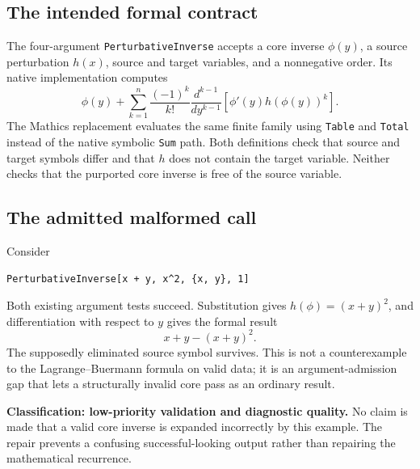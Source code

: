\documentclass[11pt,letterpaper]{article}
\newcommand{\code}[1]{\nolinkurl{#1}}
\begin{document}
\subsection{The intended formal contract}
The four-argument \code{PerturbativeInverse} accepts a core inverse \(\phi(y)\), a source perturbation \(h(x)\), source and target variables, and a nonnegative order. Its native implementation computes
\begin{equation}
 \phi(y)+\sum_{k=1}^{n}\frac{(-1)^k}{k!}
 \frac{d^{k-1}}{dy^{k-1}}
 \left[\phi'(y)h(\phi(y))^k\right].
 \label{eq:perturbative}
\end{equation}
The Mathics replacement evaluates the same finite family using \code{Table} and \code{Total} instead of the native symbolic \code{Sum} path. Both definitions check that source and target symbols differ and that \(h\) does not contain the target variable. Neither checks that the purported core inverse is free of the source variable.\cite{core,mathicscalculus}

\subsection{The admitted malformed call}
Consider
\par\noindent\begin{minipage}{\linewidth}
\begin{lstlisting}
PerturbativeInverse[x + y, x^2, {x, y}, 1]
\end{lstlisting}
\end{minipage}\par
Both existing argument tests succeed. Substitution gives \(h(\phi)=(x+y)^2\), and differentiation with respect to \(y\) gives the formal result
\[
 x+y-(x+y)^2.
\]
The supposedly eliminated source symbol survives. This is not a counterexample to the Lagrange--Buermann formula on valid data; it is an argument-admission gap that lets a structurally invalid core pass as an ordinary result.

\textbf{Classification: low-priority validation and diagnostic quality.} No claim is made that a valid core inverse is expanded incorrectly by this example. The repair prevents a confusing successful-looking output rather than repairing the mathematical recurrence.
\end{document}
